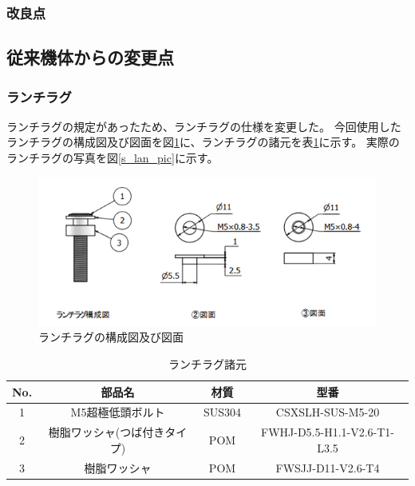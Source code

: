\documentclass[a4paper,11pt,titlepage,uplatex]{jsarticle}
\begin{document}
\subsubsection{改良点}

\subsection{従来機体からの変更点}

\subsubsection{ランチラグ}
ランチラグの規定があったため、ランチラグの仕様を変更した。
今回使用したランチラグの構成図及び図面を図\ref{s_launchlag}に、ランチラグの諸元を表\ref{s_launchlag_syo}に示す。
実際のランチラグの写真を図\ref{s_lan_pic}に示す。

\begin{figure}[H]
    \centering
    \includegraphics{pic_str/s_launchlag.png}
    \caption{ランチラグの構成図及び図面}
    \label{s_launchlag}
\end{figure}

\begin{table}[H]
    \centering
    \caption{ランチラグ諸元}
    \begin{tabular}{cccc}\toprule
         No.&部品名&材質&型番\\ \midrule
         1&M5超極低頭ボルト&SUS304& CSXSLH-SUS-M5-20\\
         2&樹脂ワッシャ(つば付きタイプ)&POM&FWHJ-D5.5-H1.1-V2.6-T1-L3.5\\
         3&樹脂ワッシャ&POM&FWSJJ-D11-V2.6-T4\\ \bottomrule
    \end{tabular}
    \label{s_launchlag_syo}
\end{table}
\end{document}

